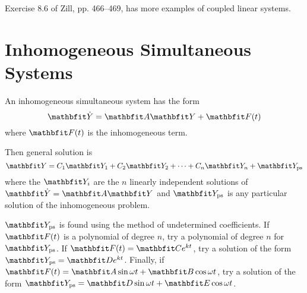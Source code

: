 \begin{exercise}
Exercise 8.6 of Zill, pp. 466--469, has more examples of coupled linear
systems.
\end{exercise}

\section{Inhomogeneous Simultaneous Systems}

An inhomogeneous simultaneous system has the form
$$\vect{\dot{Y}}=\vect{A}\vect{Y}+\vect{F}(t)$$
where $\vect{F}(t)$ is the inhomogeneous term.

Then general solution is
$$\vect{Y}=C_1\vect{Y}_1+C_2\vect{Y}_2+\cdots+C_n\vect{Y}_n
+\vect{Y}_{\rm ps}$$
where the $\vect{Y}_i$ are the $n$ linearly independent solutions of
$\vect{\dot{Y}}=\vect{A}\vect{Y}$ and $\vect{Y}_{\rm ps}$ is any particular
solution of the inhomogeneous problem.

$\vect{Y}_{\rm ps}$ is found using the method of undetermined coefficients.
If $\vect{F}(t)$ is a polynomial of degree $n$, try a polynomial of degree
$n$ for $\vect{Y}_{\rm ps}$.  If $\vect{F}(t)=\vect{C}e^{kt}$, try a
solution of the form $\vect{Y}_{\rm ps}=\vect{D}e^{kt}$.  Finally, if
$\vect{F}(t)=\vect{A}\sin\omega t+\vect{B}\cos\omega t$, try a solution of
the form $\vect{Y}_{\rm ps}=\vect{D}\sin\omega t+\vect{E}\cos\omega t$.


